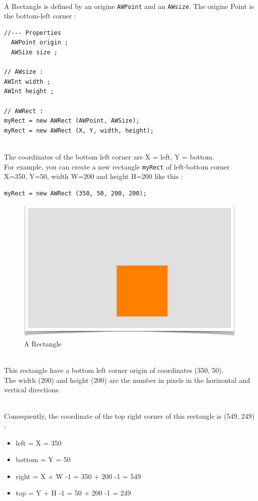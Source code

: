 \documentclass[a4paper,11pt]{extarticle}
\begin{document}
~\\ A Rectangle is defined by an origine \texttt{AWPoint} and an \texttt{AWsize}. The origine Point is the bottom-left corner :

\begin{lstlisting}[language=Arduinonl]
//--- Properties
  AWPoint origin ;
  AWSize size ;
  
// AWsize :
AWInt width ;
AWInt height ;

// AWRect :
myRect = new AWRect (AWPoint, AWSize);
myRect = new AWRect (X, Y, width, height);
\end{lstlisting}

~\\The coordinates of the bottom left corner are X = left, Y = bottom.
~\\ For example, you can create a new rectangle \texttt{myRect} of left-bottom corner X=350, Y=50, width W=200 and height H=200 like this :
\begin{lstlisting}[language=Arduinonl]
myRect = new AWRect (350, 50, 200, 200);
\end{lstlisting}

\begin{figure}[htbp]
   \centering
   \includegraphics[scale=0.7]{AWFig6.png} 
   \caption{A Rectangle}
   \label{fig:6 }
\end{figure}

~\\ This rectangle have a bottom left corner origin of coordinates (350, 50).
~\\ The width (200) and height (200) are the number in pixels in the horizontal and vertical directions.

~\\ Consequently, the coordinate of the top right corner of this rectangle is (549, 249) :
\begin{itemize}
\item left = X = 350
\item bottom = Y = 50
\item right = X + W -1 = 350 + 200 -1 = 549
\item top = Y + H -1 = 50 + 200 -1 = 249
\end{itemize}
\end{document}

